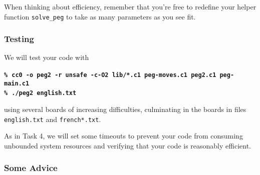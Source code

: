 \documentclass[12pt]{exam}
\begin{document}
When thinking about efficiency, remember that you're free to redefine
your helper function \lstinline'solve_peg' to take as many parameters
as you see fit.





\subsubsection*{Testing}

We will test your code with
\par\medskip\noindent
\bgroup\bf\small
\texttt{\%}~\lstinline[language={[coin]C},deletecomment={[s]{/*}{*/}}]'cc0 -o peg2 -r unsafe -c-O2 lib/*.c1 peg-moves.c1 peg2.c1 peg-main.c1'\\
\texttt{\%}~\lstinline[language={[coin]C}]'./peg2 english.txt'
\egroup
\par\medskip\noindent
using several boards of increasing difficulties, culminating in the
boards in files \lstinline'english.txt' and \lstinline'french*.txt'.

As in Task 4, we will set some timeouts to prevent your code from
consuming unbounded system resources and verifying that your code
is reasonably efficient.


\subsubsection*{Some Advice}
\end{document}
